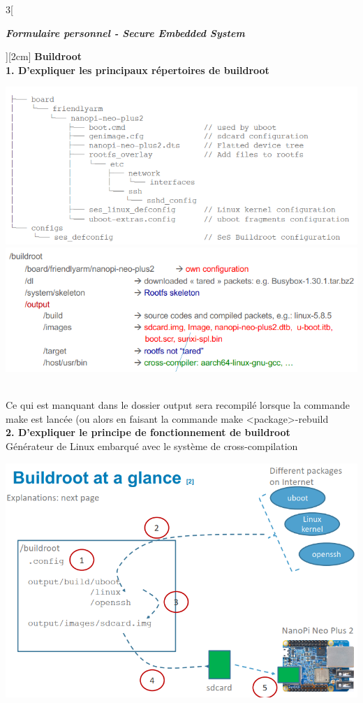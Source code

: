 \begin{multicols}{3}[\centerline{ \large\em \textbf{Formulaire personnel - Secure Embedded System}}][2cm]
{\Large \textbf{Buildroot}}\\
\textbf{1. D’expliquer les principaux répertoires de buildroot\\}
	
\begin{minipage}{\linewidth}
	\centering
    \includegraphics[width =0.6\columnwidth]{images/1.png}
    \includegraphics[width =0.6\columnwidth]{images/2.png}
\end{minipage}\\
Ce qui est manquant dans le dossier output sera recompilé lorsque la commande make est lancée (ou alors en faisant la commande make <package>-rebuild\\
\textbf{2. D’expliquer le principe de fonctionnement de buildroot\\}
Générateur de Linux embarqué avec le système de cross-compilation\\
\begin{minipage}{\linewidth}
	\centering
    \includegraphics[width =0.8\columnwidth]{images/3.png}

\end{minipage}
\end{multicols}
